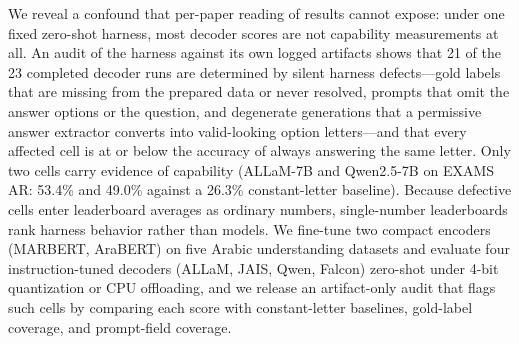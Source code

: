 %
%

We reveal a confound that per-paper reading of results cannot expose: under one fixed
zero-shot harness, most decoder scores are not capability measurements at all. An audit
of the harness against its own logged artifacts shows that 21 of the 23 completed decoder
runs are determined by silent harness defects---gold labels that are missing from the
prepared data or never resolved, prompts that omit the answer options or the question,
and degenerate generations that a permissive answer extractor converts into valid-looking
option letters---and that every affected cell is at or below the accuracy of always
answering the same letter. Only two cells carry evidence of capability (ALLaM-7B and
Qwen2.5-7B on EXAMS AR: 53.4\% and 49.0\% against a 26.3\% constant-letter baseline).
Because defective cells enter leaderboard averages as ordinary numbers, single-number
leaderboards rank harness behavior rather than models. We fine-tune two compact encoders
(MARBERT, AraBERT) on five Arabic understanding datasets and evaluate four
instruction-tuned decoders (ALLaM, JAIS, Qwen, Falcon) zero-shot under 4-bit quantization
or CPU offloading, and we release an artifact-only audit that flags such cells by
comparing each score with constant-letter baselines, gold-label coverage, and
prompt-field coverage.

